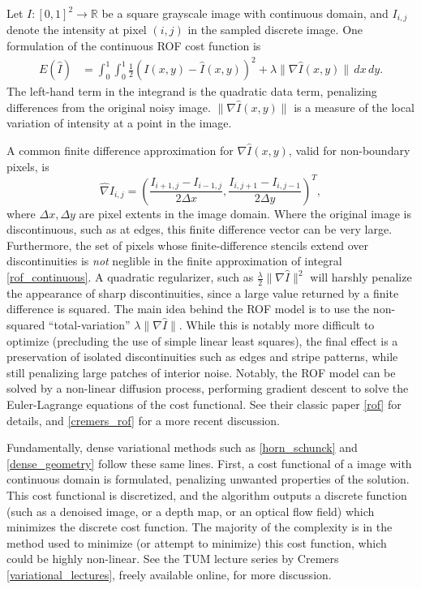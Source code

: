 \documentclass[conference]{IEEEtran}
\begin{document}
Let $I:[0,1]^2 \rightarrow \mathbb{R}$ be a square grayscale image with continuous domain, and
$I_{i,j}$ denote the intensity at pixel $(i, j)$ in the sampled discrete image.
One formulation of the continuous ROF cost function is
\begin{equation}\label{rof_continuous}
\begin{split}
    E(\hat{I}) &= \int_0^1\int_0^1 \frac{1}{2} \left(I(x,y) - \hat{I}(x,y)\right)^2 + \lambda \|\nabla \hat{I}(x,y)\| \,dx \,dy.
\end{split}
\end{equation}
The left-hand term in the integrand is the quadratic data term, penalizing differences from the original noisy image.
$\|\nabla \hat{I}(x,y)\|$ is a measure of the local variation of intensity at a point in the image.

A common finite difference approximation for $\nabla\hat{I}(x,y)$, valid for non-boundary pixels, is
\begin{equation}
    \hat{\nabla}I_{i,j} = \left(\frac{I_{i+1,j} - I_{i-1,j}}{2\Delta x}, \frac{I_{i,j+1} - I_{i,j-1}}{2\Delta y}\right)^T,
\end{equation}
where $\Delta x, \Delta y$ are pixel extents in the image domain. Where the original image is discontinuous, such as at edges,
this finite difference vector can be very large. Furthermore, the set of pixels whose finite-difference stencils extend over discontinuities is
\textit{not} neglible in the finite approximation of integral \eqref{rof_continuous}. A quadratic regularizer, such as
$\frac{\lambda}{2} \|\nabla \hat{I}\|^2$ will harshly penalize the appearance of sharp discontinuities, since a large value returned
by a finite difference is squared. The main idea behind the ROF model is to use the non-squared ``total-variation'' $\lambda \|\nabla \hat{I}\|$.
While this is notably more difficult to optimize (precluding the use of simple linear least squares), the final effect is a preservation
of isolated discontinuities such as edges and stripe patterns, while still penalizing large patches of interior noise. Notably, the ROF model can be solved by a non-linear diffusion process, performing gradient descent to solve the Euler-Lagrange
equations of the cost functional. See their classic paper \ref{rof} for details, and \ref{cremers_rof} for a more recent discussion.

Fundamentally, dense variational methods such as \eqref{horn_schunck} and \eqref{dense_geometry} follow these same lines. First,
a cost functional of a image with continuous domain is formulated, penalizing unwanted properties of the solution. This cost functional is discretized,
and the algorithm outputs a discrete function (such as a denoised image, or a depth map, or an optical flow field) which minimizes the discrete cost function.
The majority of the complexity is in the method used to minimize (or attempt to minimize) this cost function, which could be highly non-linear.
See the TUM lecture series by Cremers \ref{variational_lectures}, freely available online, for more discussion.
\end{document}
